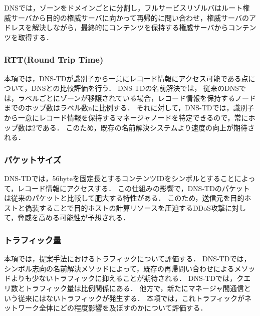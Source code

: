 DNSでは，ゾーンをドメインごとに分割し，フルサービスリゾルバはルート権威サーバから目的の権威サーバに向かって再帰的に問い合わせ，権威サーバのアドレスを解決しながら，最終的にコンテンツを保持する権威サーバからコンテンツを取得する．

\subsubsection{RTT(Round Trip Time)}
本項では，DNS-TDが識別子から一意にレコード情報にアクセス可能である点について，DNSとの比較評価を行う．
DNS-TDの名前解決では，
従来のDNSでは，ラベルごとにゾーンが移譲されている場合，レコード情報を保持するノードまでのホップ数はラベル数nに比例する．
それに対して，DNS-TDでは，識別子から一意にレコード情報を保持するマネージャノードを特定できるので，常にホップ数は2である．
このため，既存の名前解決システムより速度の向上が期待される．
\subsubsection{パケットサイズ}
DNS-TDでは，56byteを固定長とするコンテンツIDをシンボルとすることによって，レコード情報にアクセスする．
この仕組みの影響で，DNS-TDのパケットは従来のパケットと比較して肥大する特性がある．
このため，送信元を目的ホストと偽装することで目的ホストの計算リソースを圧迫するDDoS攻撃に対して，脅威を高める可能性が予想される．
\subsubsection{トラフィック量}
本項では，提案手法におけるトラフィックについて評価する．
DNS-TDでは，シンボル志向の名前解決メソッドによって，既存の再帰問い合わせによるメソッドよりも少ないトラフィックに抑えることが期待される．
DNS-TDでは，クエリ数とトラフィック量は比例関係にある．
他方で，新たにマネージャ間通信という従来にはないトラフィックが発生する．
本項では，これトラフィックがネットワーク全体にどの程度影響を及ぼすのかについて評価する．

